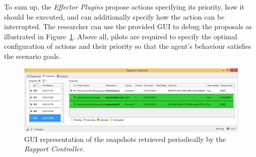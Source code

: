 To sum up, the \textit{Effector Plugins} propose actions specifying its priority, how it should be executed, and can additionally specify how the action can be interrupted. The researcher can use the provided \ac{GUI} to debug the proposals as illustrated in Figure~\ref{fig:controllerSnapshots}. Above all, pilots are required to specify the optimal configuration of actions and their priority so that the agent's behaviour satisfies the scenario goals. 

\begin{figure}[H]
	\centering
	\includegraphics[width=\textwidth]{images/ScreenshotSnapshots.png}
	\caption{\ac{GUI} representation of the snapshots retrieved periodically by the \textit{Rapport Controller}.}
	\label{fig:controllerSnapshots}
\end{figure}